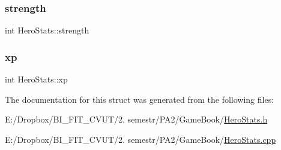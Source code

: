 \subsubsection{\texorpdfstring{strength}{strength}}
{\footnotesize\ttfamily int Hero\+Stats\+::strength}

\mbox{\label{struct_hero_stats_a88fe51932e635e55e3b94cc14abb69cf}} 
\subsubsection{\texorpdfstring{xp}{xp}}
{\footnotesize\ttfamily int Hero\+Stats\+::xp}



The documentation for this struct was generated from the following files\+:\begin{DoxyCompactItemize}
\item 
E\+:/\+Dropbox/\+B\+I\+\_\+\+F\+I\+T\+\_\+\+C\+V\+U\+T/2. semestr/\+P\+A2/\+Game\+Book/\mbox{\hyperlink{_hero_stats_8h}{Hero\+Stats.\+h}}\item 
E\+:/\+Dropbox/\+B\+I\+\_\+\+F\+I\+T\+\_\+\+C\+V\+U\+T/2. semestr/\+P\+A2/\+Game\+Book/\mbox{\hyperlink{_hero_stats_8cpp}{Hero\+Stats.\+cpp}}\end{DoxyCompactItemize}
